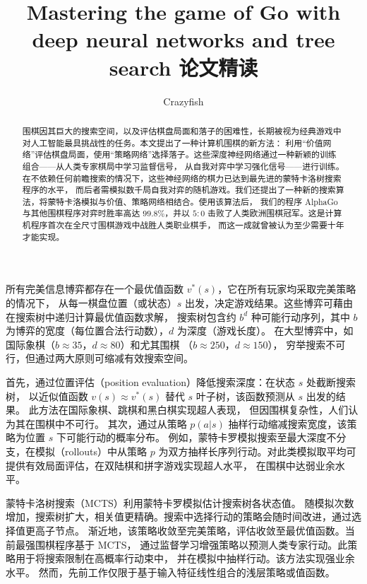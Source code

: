 \documentclass[12pt]{article}
\title{Mastering the game of Go with deep 
neural networks and tree search 论文精读}
\author{Crazyfish}
\date{}
\begin{document}
\maketitle


\begin{abstract}
围棋因其巨大的搜索空间，以及评估棋盘局面和落子的困难性，长期被视为经典游戏中对人工智能最具挑战性的任务。本文提出了一种计算机围棋的新方法：
利用“价值网络”评估棋盘局面，使用“策略网络”选择落子。这些深度神经网络通过一种新颖的训练组合——从人类专家棋局中学习监督信号，
从自我对弈中学习强化信号——进行训练。在不依赖任何前瞻搜索的情况下，这些神经网络的棋力已达到最先进的蒙特卡洛树搜索程序的水平，
而后者需模拟数千局自我对弈的随机游戏。我们还提出了一种新的搜索算法，将蒙特卡洛模拟与价值、策略网络相结合。使用该算法后，
我们的程序 AlphaGo 与其他围棋程序对弈时胜率高达 $99.8\%$，并以 $5:0$ 击败了人类欧洲围棋冠军。这是计算机程序首次在全尺寸围棋游戏中战胜人类职业棋手，
而这一成就曾被认为至少需要十年才能实现。
\end{abstract}

所有完美信息博弈都存在一个最优值函数 $ v^\ast(s) $，它在所有玩家均采取完美策略的情况下，
从每一棋盘位置（或状态）$ s $ 出发，决定游戏结果。这些博弈可藉由在搜索树中递归计算最优值函数求解，
搜索树包含约 $ b^d $ 种可能行动序列，其中 $ b $ 为博弈的宽度（每位置合法行动数），$ d $ 为深度（游戏长度）。
在大型博弈中，如国际象棋（$ b\approx 35 $，$ d\approx 80 $）\cite{campbell2002deepblue}和尤其围棋
（$ b\approx 250 $，$ d\approx 150 $）\cite{schaeffer2000games}，
穷举搜索不可行\cite{allis1994searching, vandenhrik2002games}，但通过两大原则可缩减有效搜索空间。

首先，通过位置评估（position evaluation）降低搜索深度：在状态 $ s $ 处截断搜索树，
以近似值函数 $ v(s)\approx v^\ast(s) $ 替代 $ s $ 叶子树，该函数预测从 $ s $ 出发的结果。
此方法在国际象棋\cite{campbell2002deepblue}、跳棋\cite{schaeffer1992checkers}和黑白棋\cite{buro1999simple}实现超人表现，
但因围棋复杂性，人们认为其在围棋中不可行\cite{muller2002computer}。
其次，通过从策略 $ p(a|s) $ 抽样行动缩减搜索宽度，该策略为位置 $ s $ 下可能行动的概率分布。
例如，蒙特卡罗模拟\cite{tesauro1996online}搜索至最大深度不分支，在模拟（rollouts）中从策略 $ p $ 
为双方抽样长序列行动。对此类模拟取平均可提供有效局面评估，在双陆棋\cite{tesauro1996online}和拼字游戏\cite{sheppard2002scrabble}实现超人水平，
在围棋中达弱业余水平\cite{bouzy2003monte}。

蒙特卡洛树搜索（MCTS）\cite{coulom2006efficient, kocsis2006bandit}利用蒙特卡罗模拟估计搜索树各状态值。
随模拟次数增加，搜索树扩大，相关值更精确。搜索中选择行动的策略会随时间改进，通过选择值更高子节点。
渐近地，该策略收敛至完美策略，评估收敛至最优值函数\cite{kocsis2006bandit}。当前最强围棋程序基于 MCTS，
通过监督学习增强策略以预测人类专家行动\cite{coulom2007computing}。此策略用于将搜索限制在高概率行动束中，
并在模拟中抽样行动。该方法实现强业余水平\cite{coulom2007computing, baudis2012pachi, muller2010fuego}。
然而，先前工作仅限于基于输入特征线性组合的浅层策略或值函数\cite{gelly2007combining}。
\end{document}

